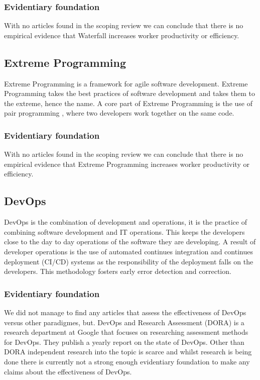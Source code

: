 \documentclass[12pt]{article}
\begin{document}
\subsubsection{Evidentiary foundation}
With no articles found in the scoping review we can conclude that there is no empirical evidence that Waterfall increases worker productivity or efficiency.

\subsection{Extreme Programming}
Extreme Programming \cite{ExtremeProgramming2025} is a framework for agile software development. Extreme Programming takes 
the best practices of software development and takes them to the extreme, hence the name. A core part of Extreme Programming is the use of
pair programming \cite{PairProgramming2024}, where two developers work together on the same code.

\subsubsection{Evidentiary foundation}
With no articles found in the scoping review we can conclude that there is no empirical evidence that Extreme Programming increases worker productivity or efficiency.

\subsection{DevOps}
DevOps is the combination of development and operations, it is the practice of combining software development and IT operations.
This keeps the developers close to the day to day operations of the software they are developing. A result of developer operations is 
the use of automated continues integration and continues deployment (CI/CD) \cite{ContinuousDelivery2025} systems as the responsibility 
of the deployment falls on the developers. This methodology fosters early error detection and correction.

\subsubsection{Evidentiary foundation}
We did not manage to find any articles that assess the effectiveness of DevOps versus other paradigmes, but.
DevOps and Research Assessment (DORA) \cite{DORAGetBetter} is a research department at Google that focuses on 
researching assessment methods for DevOps. They publish a yearly report on the state of DevOps. Other than DORA independent research
into the topic is scarce and whilst research is being done there is currently not a strong enough evidentiary foundation to make 
any claims about the effectiveness of DevOps.
\end{document}
